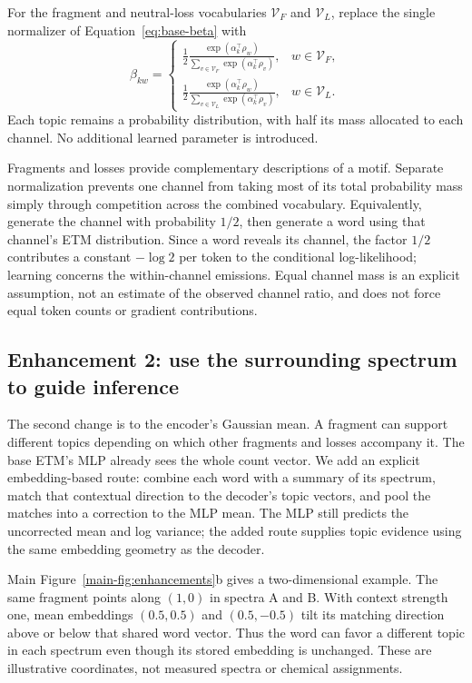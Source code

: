 \documentclass[10pt,a4paper]{article}
\begin{document}
For the fragment and neutral-loss vocabularies $\mathcal V_F$ and
$\mathcal V_L$, replace
the single normalizer of Equation~\ref{eq:base-beta} with
\begin{equation}
 \beta_{kw}=
 \begin{cases}
 \displaystyle\frac12\frac{\exp(\alpha_k^\top\rho_w)}
   {\sum_{v\in\mathcal V_F}\exp(\alpha_k^\top\rho_v)}, & w\in\mathcal V_F,\\[7pt]
 \displaystyle\frac12\frac{\exp(\alpha_k^\top\rho_w)}
   {\sum_{v\in\mathcal V_L}\exp(\alpha_k^\top\rho_v)}, & w\in\mathcal V_L.
 \end{cases}
 \label{eq:beta}
\end{equation}
Each topic remains a probability distribution, with half its mass allocated
to each channel. No additional learned parameter is introduced.

Fragments and losses provide complementary descriptions of a motif. Separate
normalization prevents one channel from taking most of its total probability
mass simply through competition across the combined vocabulary.
Equivalently, generate the channel with probability $1/2$, then generate a
word using that channel's ETM distribution. Since a word reveals its channel,
the factor $1/2$ contributes a constant $-\log2$ per token to the conditional
log-likelihood; learning concerns the within-channel emissions.
Equal channel mass is an explicit assumption, not an estimate of the observed
channel ratio, and does not force equal token counts or gradient contributions.

\subsection{Enhancement 2: use the surrounding spectrum to guide inference}
\label{sec:context}

The second change is to the encoder's Gaussian mean. A fragment can support
different topics depending on which other fragments and losses accompany it.
The base ETM's MLP already sees the whole count vector. We add an explicit
embedding-based route: combine each word with a summary of its spectrum,
match that contextual direction to the decoder's topic vectors, and pool the
matches into a correction to the MLP mean. The MLP still predicts the uncorrected mean
and log variance; the added route supplies topic evidence using the same
embedding geometry as the decoder.

Main Figure~\ref{main-fig:enhancements}b gives a two-dimensional example. The same
fragment points along $(1,0)$ in spectra A and B. With context strength one,
mean embeddings $(0.5,0.5)$ and $(0.5,-0.5)$ tilt its matching direction above
or below that shared word vector. Thus the word can favor a different topic
in each spectrum even though its stored embedding is unchanged. These are
illustrative coordinates, not measured spectra or chemical assignments.
\end{document}
